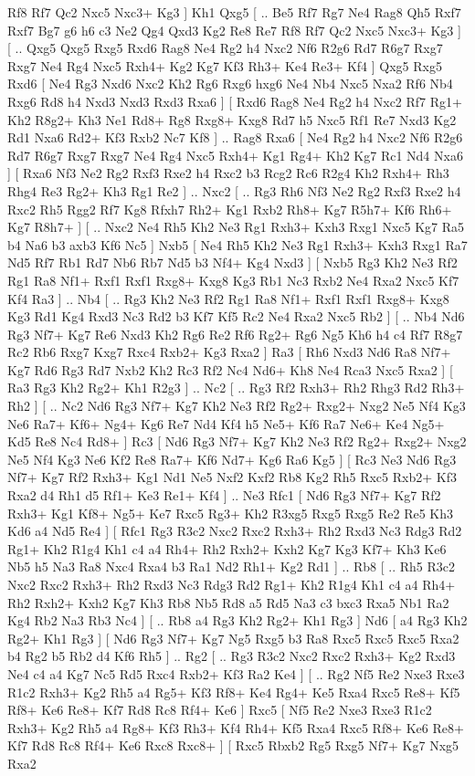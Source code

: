 Rf8  Rf7 Qc2  Nxc5 Nxc3+  Kg3   ]  Kh1   Qxg5 [ .. Be5  Rf7 Rg7  Ne4 Rag8  Qh5 Rxf7  Rxf7 Bg7  g6 h6  c3 Ne2  Qg4 Qxd3  Kg2 Re8  Re7 Rf8  Rf7 Qc2  Nxc5 Nxc3+  Kg3   ]  [ .. Qxg5  Qxg5 Rxg5  Rxd6 Rag8  Ne4 Rg2  h4 Nxc2  Nf6 R2g6  Rd7 R6g7  Rxg7 Rxg7  Ne4 Rg4  Nxc5 Rxh4+  Kg2 Kg7  Kf3 Rh3+  Ke4 Re3+  Kf4   ]  Qxg5   Rxg5    Rxd6 [  Ne4 Rg3  Nxd6 Nxc2  Kh2 Rg6  Rxg6 hxg6  Ne4 Nb4  Nxc5 Nxa2  Rf6 Nb4  Rxg6 Rd8  h4 Nxd3  Nxd3 Rxd3  Rxa6   ]  [  Rxd6 Rag8  Ne4 Rg2  h4 Nxc2  Rf7 Rg1+  Kh2 R8g2+  Kh3 Ne1  Rd8+ Rg8  Rxg8+ Kxg8  Rd7 h5  Nxc5 Rf1  Re7 Nxd3  Kg2 Rd1  Nxa6 Rd2+  Kf3 Rxb2  Nc7 Kf8   ] .. Rag8    Rxa6 [  Ne4 Rg2  h4 Nxc2  Nf6 R2g6  Rd7 R6g7  Rxg7 Rxg7  Ne4 Rg4  Nxc5 Rxh4+  Kg1 Rg4+  Kh2 Kg7  Rc1 Nd4  Nxa6   ]  [  Rxa6 Nf3  Ne2 Rg2  Rxf3 Rxe2  h4 Rxc2  b3 Rcg2  Rc6 R2g4  Kh2 Rxh4+  Rh3 Rhg4  Re3 Rg2+  Kh3 Rg1  Re2   ] .. Nxc2 [ .. Rg3  Rh6 Nf3  Ne2 Rg2  Rxf3 Rxe2  h4 Rxc2  Rh5 Rgg2  Rf7 Kg8  Rfxh7 Rh2+  Kg1 Rxb2  Rh8+ Kg7  R5h7+ Kf6  Rh6+ Kg7  R8h7+   ]  [ .. Nxc2  Ne4 Rh5  Kh2 Ne3  Rg1 Rxh3+  Kxh3 Rxg1  Nxc5 Kg7  Ra5 b4  Na6 b3  axb3 Kf6  Nc5   ]  Nxb5 [  Ne4 Rh5  Kh2 Ne3  Rg1 Rxh3+  Kxh3 Rxg1  Ra7 Nd5  Rf7 Rb1  Rd7 Nb6  Rb7 Nd5  b3 Nf4+  Kg4 Nxd3   ]  [  Nxb5 Rg3  Kh2 Ne3  Rf2 Rg1  Ra8 Nf1+  Rxf1 Rxf1  Rxg8+ Kxg8  Kg3 Rb1  Nc3 Rxb2  Ne4 Rxa2  Nxc5 Kf7  Kf4 Ra3   ] .. Nb4 [ .. Rg3  Kh2 Ne3  Rf2 Rg1  Ra8 Nf1+  Rxf1 Rxf1  Rxg8+ Kxg8  Kg3 Rd1  Kg4 Rxd3  Nc3 Rd2  b3 Kf7  Kf5 Rc2  Ne4 Rxa2  Nxc5 Rb2   ]  [ .. Nb4  Nd6 Rg3  Nf7+ Kg7  Re6 Nxd3  Kh2 Rg6  Re2 Rf6  Rg2+ Rg6  Ng5 Kh6  h4 c4  Rf7 R8g7  Rc2 Rb6  Rxg7 Kxg7  Rxc4 Rxb2+  Kg3 Rxa2   ]  Ra3 [  Rh6 Nxd3  Nd6 Ra8  Nf7+ Kg7  Rd6 Rg3  Rd7 Nxb2  Kh2 Rc3  Rf2 Nc4  Nd6+ Kh8  Ne4 Rca3  Nxc5 Rxa2   ]  [  Ra3 Rg3  Kh2 Rg2+  Kh1 R2g3   ] .. Nc2 [ .. Rg3  Rf2 Rxh3+  Rh2 Rhg3  Rd2 Rh3+  Rh2   ]  [ .. Nc2  Nd6 Rg3  Nf7+ Kg7  Kh2 Ne3  Rf2 Rg2+  Rxg2+ Nxg2  Ne5 Nf4  Kg3 Ne6  Ra7+ Kf6+  Ng4+ Kg6  Re7 Nd4  Kf4 h5  Ne5+ Kf6  Ra7 Ne6+  Ke4 Ng5+  Kd5 Re8  Nc4 Rd8+   ]  Rc3 [  Nd6 Rg3  Nf7+ Kg7  Kh2 Ne3  Rf2 Rg2+  Rxg2+ Nxg2  Ne5 Nf4  Kg3 Ne6  Kf2 Re8  Ra7+ Kf6  Nd7+ Kg6  Ra6 Kg5   ]  [  Rc3 Ne3  Nd6 Rg3  Nf7+ Kg7  Rf2 Rxh3+  Kg1 Nd1  Ne5 Nxf2  Kxf2 Rb8  Kg2 Rh5  Rxc5 Rxb2+  Kf3 Rxa2  d4 Rh1  d5 Rf1+  Ke3 Re1+  Kf4   ] .. Ne3    Rfc1 [  Nd6 Rg3  Nf7+ Kg7  Rf2 Rxh3+  Kg1 Kf8+  Ng5+ Ke7  Rxc5 Rg3+  Kh2 R3xg5  Rxg5 Rxg5  Re2 Re5  Kh3 Kd6  a4 Nd5  Re4   ]  [  Rfc1 Rg3  R3c2 Nxc2  Rxc2 Rxh3+  Rh2 Rxd3  Nc3 Rdg3  Rd2 Rg1+  Kh2 R1g4  Kh1 c4  a4 Rh4+  Rh2 Rxh2+  Kxh2 Kg7  Kg3 Kf7+  Kh3 Ke6  Nb5 h5  Na3 Ra8  Nxc4 Rxa4  b3 Ra1  Nd2 Rh1+  Kg2 Rd1   ] .. Rb8 [ .. Rh5  R3c2 Nxc2  Rxc2 Rxh3+  Rh2 Rxd3  Nc3 Rdg3  Rd2 Rg1+  Kh2 R1g4  Kh1 c4  a4 Rh4+  Rh2 Rxh2+  Kxh2 Kg7  Kh3 Rb8  Nb5 Rd8  a5 Rd5  Na3 c3  bxc3 Rxa5  Nb1 Ra2  Kg4 Rb2  Na3 Rb3  Nc4   ]  [ .. Rb8  a4 Rg3  Kh2 Rg2+  Kh1 Rg3   ]  Nd6 [  a4 Rg3  Kh2 Rg2+  Kh1 Rg3   ]  [  Nd6 Rg3  Nf7+ Kg7  Ng5 Rxg5  b3 Ra8  Rxc5 Rxc5  Rxc5 Rxa2  b4 Rg2  b5 Rb2  d4 Kf6  Rh5   ] .. Rg2 [ .. Rg3  R3c2 Nxc2  Rxc2 Rxh3+  Kg2 Rxd3  Ne4 c4  a4 Kg7  Nc5 Rd5  Rxc4 Rxb2+  Kf3 Ra2  Ke4   ]  [ .. Rg2  Nf5 Re2  Nxe3 Rxe3  R1c2 Rxh3+  Kg2 Rh5  a4 Rg5+  Kf3 Rf8+  Ke4 Rg4+  Ke5 Rxa4  Rxc5 Re8+  Kf5 Rf8+  Ke6 Re8+  Kf7 Rd8  Rc8 Rf4+  Ke6   ]  Rxc5 [  Nf5 Re2  Nxe3 Rxe3  R1c2 Rxh3+  Kg2 Rh5  a4 Rg8+  Kf3 Rh3+  Kf4 Rh4+  Kf5 Rxa4  Rxc5 Rf8+  Ke6 Re8+  Kf7 Rd8  Rc8 Rf4+  Ke6 Rxc8  Rxc8+   ]  [  Rxc5 Rbxb2  Rg5 Rxg5  Nf7+ Kg7  Nxg5 Rxa2  